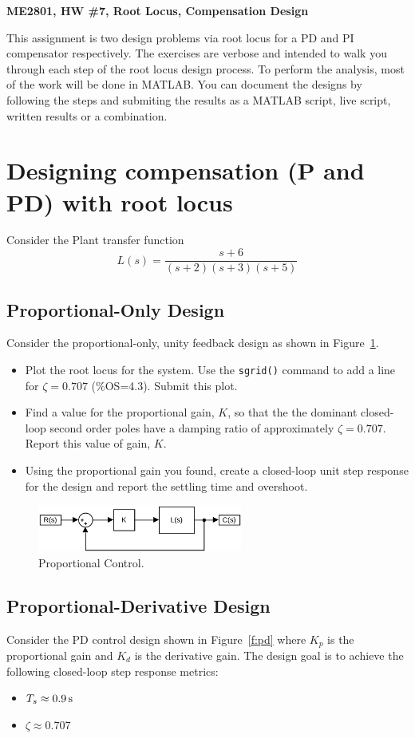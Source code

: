 \documentclass[11pt]{article}
\begin{document}
\begin{center}
  \huge{\bf ME2801, HW \#7, Root Locus, Compensation Design}
\end{center}

This assignment is two design problems via root locus for a PD and PI compensator respectively.  The exercises are verbose and intended to walk you through each step of the root locus design process.  To perform the analysis, most of the work will be done in MATLAB.  You can document the designs by following the steps and submiting the results as a MATLAB script, live script, written results or a combination.


\section{Designing compensation (P and PD) with root locus}

Consider the Plant transfer function
\[
L(s) = \frac{s+6}{(s+2)(s+3)(s+5)}
\]

\subsection{Proportional-Only Design}
Consider the proportional-only, unity feedback design as shown in Figure~\ref{f:p}.
\begin{itemize}
\item Plot the root locus for the system.  Use the \texttt{sgrid()} command to add a line for $\zeta=0.707$ (\%OS=4.3).  Submit this plot.
\item Find a value for the proportional gain, $K$, so that the the dominant closed-loop second order poles have a damping ratio of approximately $\zeta = 0.707$.  Report this value of gain, $K$.
\item Using the proportional gain you found, create a closed-loop unit step response for the design and report the settling time and overshoot.
\end{itemize}
\begin{figure}[hbt!]
\centering  
\includegraphics [width=0.6\textwidth]{p_control.png}
\caption{Proportional Control.}
\label{f:p}
\end{figure}


\subsection{Proportional-Derivative Design}
Consider the PD control design shown in Figure~\ref{f:pd} where $K_p$ is the proportional gain and $K_d$ is the derivative gain.  The design goal is to achieve the following closed-loop step response metrics:
\begin{itemize}
\item $T_s \approx \unit[0.9]{s}$
\item $\zeta \approx 0.707$
\end{itemize}
\end{document}
